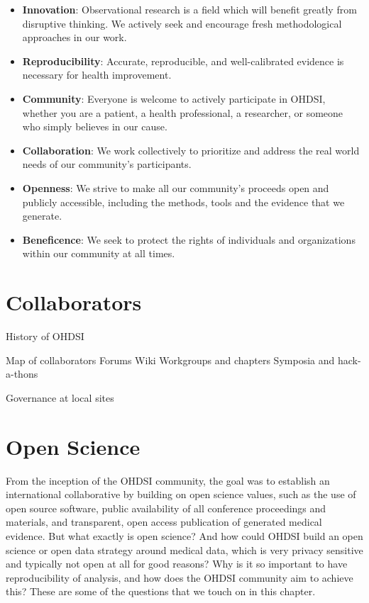 \documentclass[11pt]{book}
\begin{document}
\begin{itemize}
\item
  \textbf{Innovation}: Observational research is a field which will
  benefit greatly from disruptive thinking. We actively seek and
  encourage fresh methodological approaches in our work.
\item
  \textbf{Reproducibility}: Accurate, reproducible, and well-calibrated
  evidence is necessary for health improvement.
\item
  \textbf{Community}: Everyone is welcome to actively participate in
  OHDSI, whether you are a patient, a health professional, a researcher,
  or someone who simply believes in our cause.
\item
  \textbf{Collaboration}: We work collectively to prioritize and address
  the real world needs of our community's participants.
\item
  \textbf{Openness}: We strive to make all our community's proceeds open
  and publicly accessible, including the methods, tools and the evidence
  that we generate.
\item
  \textbf{Beneficence}: We seek to protect the rights of individuals and
  organizations within our community at all times.
\end{itemize}

\chapter{Collaborators}\label{Collaborators}

History of OHDSI

Map of collaborators Forums Wiki Workgroups and chapters Symposia and
hack-a-thons

Governance at local sites

\chapter{Open Science}\label{OpenScience}

From the inception of the OHDSI community, the goal was to establish an
international collaborative by building on open science values, such as
the use of open source software, public availability of all conference
proceedings and materials, and transparent, open access publication of
generated medical evidence. But what exactly is open science? And how
could OHDSI build an open science or open data strategy around medical
data, which is very privacy sensitive and typically not open at all for
good reasons? Why is it so important to have reproducibility of
analysis, and how does the OHDSI community aim to achieve this? These
are some of the questions that we touch on in this chapter.
\end{document}
